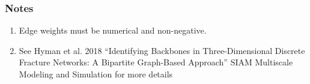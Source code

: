 \documentclass[letterpaper,10pt,english]{sphinxmanual}
\begin{document}
\begin{fulllineitems}
\subsubsection*{Notes}
\begin{enumerate}
\def\theenumi{\arabic{enumi}}
\def\labelenumi{\theenumi .}
\makeatletter\def\p@enumii{\p@enumi \theenumi .}\makeatother
\item {} 
Edge weights must be numerical and non-negative.

\item {} 
See Hyman et al. 2018 “Identifying Backbones in Three-Dimensional Discrete Fracture Networks: A Bipartite Graph-Based Approach” SIAM Multiscale Modeling and Simulation for more details

\end{enumerate}

\end{fulllineitems}

\end{document}
